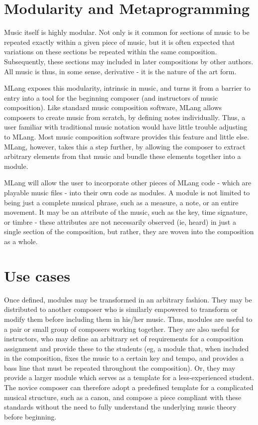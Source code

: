 \documentclass{article}
\begin{document}
\section{Modularity and Metaprogramming}


Music itself is highly modular. Not only is it common for sections of music to be repeated exactly within a given piece of music, but it is often expected that variations on these sections be repeated within the same composition. Subsequently, these sections may included in later compositions by other authors. All music is thus, in some sense, derivative - it is the nature of the art form.  


MLang exposes this modularity, intrinsic in music, and turns it from a barrier to entry into a tool for the beginning composer (and instructors of music composition). Like standard music composition software, MLang allows composers to create music from scratch, by defining notes individually.  Thus, a user familiar with traditional music notation would have little trouble adjusting to MLang. Most music composition software provides this feature and little else. MLang, however, takes this a step further, by allowing the composer to extract arbitrary elements from that music and bundle these elements together into a module.




MLang will allow the user to incorporate other pieces of MLang code - which are playable music files - into their own code as modules. A module is not limited to being just a complete musical phrase, such as a measure, a note, or an entire movement. It may be an attribute of the music, such as the key, time signature, or timbre - these attributes are not necessarily observed (ie, heard) in just a single section of the composition, but rather, they are woven into the composition as a whole. 




\section{Use cases}



Once defined, modules may be transformed in an arbitrary fashion. They may be distributed to another composer who is similarly empowered to transform or modify them before including them in his/her music. Thus, modules are useful to a pair or small group of composers working together. They are also useful for instructors, who may define an arbitrary set of requirements for a composition assignment and provide these to the students (eg, a module that, when included in the composition, fixes the music to a certain key and tempo, and provides a bass line that must be repeated throughout the composition). Or, they may provide a larger module which serves as a template for a less-experienced student. The novice composer can therefore adopt a predefined template for a complicated musical structure, such as a canon, and compose a piece compliant with these standards without the need to fully understand the underlying music theory before beginning.
\end{document}
